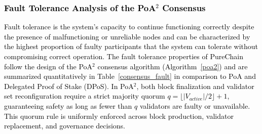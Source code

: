 \cite{cho2010survey}\documentclass[journal,comsoc,twoside]{IEEEtran}
\begin{document}
\textcolor{black}{
\subsubsection{Fault Tolerance Analysis of the PoA$^2$ Consensus}
Fault tolerance is the system’s capacity to continue functioning correctly despite the presence of malfunctioning or unreliable nodes and can be characterized by the highest proportion of faulty participants that the system can tolerate without compromising correct operation. The fault tolerance properties of PureChain follow the design of the PoA$^2$ consensus algorithm (Algorithm~\ref{poa2}) and are summarized quantitatively in Table~\ref{consensus_fault} in comparison to PoA and Delegated Proof of Stake (DPoS). In PoA$^2$, both block finalization and validator set reconfiguration require a strict majority quorum $q=\lfloor |V_{active}|/2 \rfloor + 1$, guaranteeing safety as long as fewer than $q$ validators are faulty or unavailable. This quorum rule is uniformly enforced across block production, validator replacement, and governance decisions.}
\end{document}
